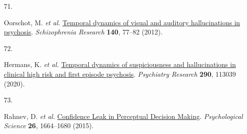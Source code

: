 \documentclass[
]{article}
\newlength{\cslhangindent}
\newlength{\csllabelwidth}
\newenvironment{CSLReferences}[2] %
 {\begin{list}{}{%
  \setlength{\itemindent}{0pt}
  \setlength{\leftmargin}{0pt}
  \setlength{\parsep}{0pt}
  \ifodd #1
   \setlength{\leftmargin}{\cslhangindent}
   \setlength{\itemindent}{-1\cslhangindent}
  \fi
  \setlength{\itemsep}{#2\baselineskip}}}
 {\end{list}}
\newcommand{\CSLLeftMargin}[1]{\parbox[t]{\csllabelwidth}{\strut#1\strut}}
\newcommand{\CSLRightInline}[1]{\parbox[t]{\linewidth - \csllabelwidth}{\strut#1\strut}}
\begin{document}
\begin{CSLReferences}{0}{0}
\CSLLeftMargin{71. }%
\CSLRightInline{Oorschot, M. \emph{et al.}
\href{https://doi.org/10.1016/j.schres.2012.06.010}{Temporal dynamics of
visual and auditory hallucinations in psychosis}. \emph{Schizophrenia
Research} \textbf{140}, 77--82 (2012).}

\CSLLeftMargin{72. }%
\CSLRightInline{Hermans, K. \emph{et al.}
\href{https://doi.org/10.1016/j.psychres.2020.113039}{Temporal dynamics
of suspiciousness and hallucinations in clinical high risk and first
episode psychosis}. \emph{Psychiatry Research} \textbf{290}, 113039
(2020).}

\CSLLeftMargin{73. }%
\CSLRightInline{Rahnev, D. \emph{et al.}
\href{https://doi.org/10.1177/0956797615595037}{Confidence {Leak} in
{Perceptual} {Decision} {Making}}. \emph{Psychological Science}
\textbf{26}, 1664--1680 (2015).}

\end{CSLReferences}
\end{document}
